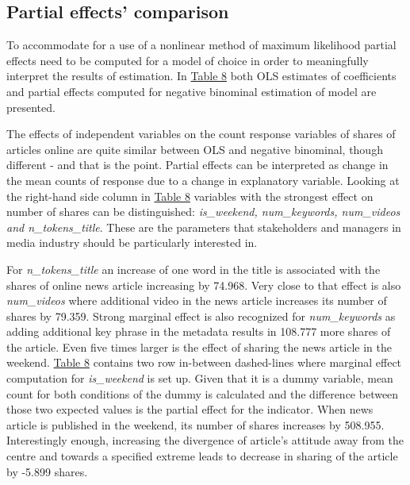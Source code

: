 \documentclass{article}
\begin{document}
\subsection{Partial effects' comparison}

To accommodate for a use of a nonlinear method of maximum likelihood partial effects need to be computed for a model of choice in order to meaningfully interpret the results of estimation. In \hyperref[tab:countpartial]{Table 8} both OLS estimates of coefficients and partial effects computed for negative binominal estimation of model are presented. 

The effects of independent variables on the count response variables of shares of articles online are quite similar between OLS and negative binominal, though different - and that is the point. Partial effects can be interpreted as change in the mean counts of response due to a change in explanatory variable. Looking at the right-hand side column in \hyperref[tab:countpartial]{Table 8} variables with the strongest effect on number of shares can be distinguished: \textit{is\_weekend, num\_keywords, num\_videos and n\_tokens\_title}. These are the parameters that stakeholders and managers in media industry should be particularly interested in.

For \textit{n\_tokens\_title} an increase of one word in the title is associated with the shares of online news article increasing by 74.968. Very close to that effect is also \textit{num\_videos} where additional video in the news article increases its number of shares by 79.359. Strong marginal effect is also recognized for \textit{num\_keywords} as adding additional key phrase in the metadata results in 108.777 more shares of the article. Even five times larger is the effect of sharing the news article in the weekend. \hyperref[tab:countpartial]{Table 8} contains two row in-between dashed-lines where marginal effect computation for \textit{is\_weekend} is set up. Given that it is a dummy variable, mean count for both conditions of the dummy is calculated and the difference between those two expected values is the partial effect for the indicator. When news article is published in the weekend, its number of shares increases by 508.955. Interestingly enough, increasing the divergence of article's attitude away from the centre and towards a specified extreme leads to decrease in sharing of the article by -5.899 shares.
\end{document}
